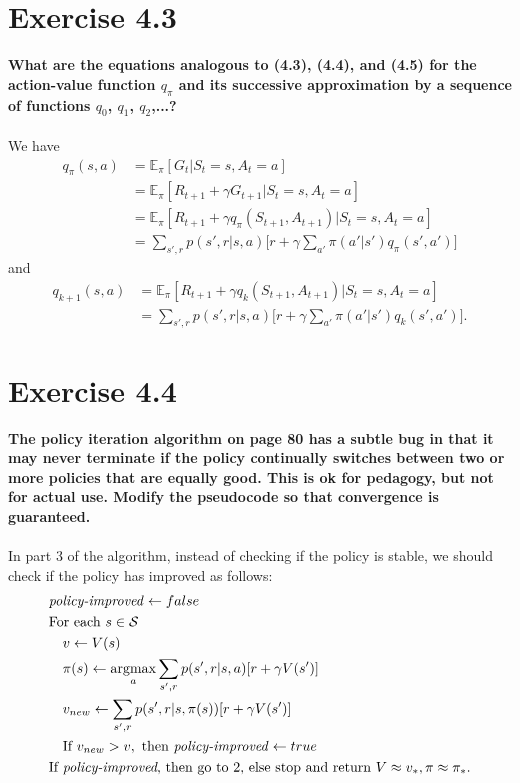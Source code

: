 \documentclass[a4paper,11pt]{article}
\numberwithin{equation}{section}
\theoremstyle{remark}
\newcommand{\E}{\mathbb E}
\DeclareMathOperator*{\argmax}{argmax}
\begin{document}
\section{Exercise 4.3}

\textbf{What are the equations analogous to (4.3), (4.4), and (4.5) for the action-value function $q_\pi$ and its successive approximation by a sequence of functions $q_0$, $q_1$, $q_2$,...?}
\\ \\
We have
\begin{align*}
	q_\pi(s, a) & = \E_\pi [G_t | S_t=s, A_t=a] \\
				& = \E_\pi [R_{t+1} + \gamma G_{t+1} | S_t=s, A_t=a] \\
				& = \E_\pi [R_{t+1} + \gamma q_\pi(S_{t+1}, A_{t+1}) |  S_t=s, A_t=a] \\
				& = \sum_{s', r} p(s', r | s, a)\Big[ r + \gamma \sum_{a'} \pi(a' | s') q_\pi(s', a') \Big]
\end{align*}
and
\begin{align*}
	q_{k+1}(s, a) & = \E_\pi [R_{t+1} + \gamma q_k(S_{t+1}, A_{t+1}) |  S_t=s, A_t=a] \\
				  & = \sum_{s', r} p(s', r | s, a)\Big[ r + \gamma \sum_{a'} \pi(a' | s') q_k(s', a') \Big].
\end{align*}

\section{Exercise 4.4}

\textbf{The policy iteration algorithm on page 80 has a subtle bug in that it may never terminate if the policy continually switches between two or more policies that are equally good. This is ok for pedagogy, but not for actual use. Modify the pseudocode so that convergence is guaranteed.}
\\ \\
In part 3 of the algorithm, instead of checking if the policy is stable, we should check if the policy has improved as follows:
\begin{align*}
	& \text{\emph{policy-improved}} \gets false \\
	& \text{For } \text{each } s \in \mathcal{S} \\
	& \quad v \gets V(s) \\
	& \quad \pi(s) \gets \argmax_a \sum_{s', r} p(s', r | s, a) [r + \gamma V(s')] \\
	& \quad v_{new} \gets \sum_{s', r} p(s', r | s, \pi(s)) [r + \gamma V(s')] \\
	& \quad \text{If } v_{new} > v, \text{ then } \text{\emph{policy-improved}} \gets true \\
	& \text{If \emph{policy-improved}, then go to 2, else stop and return } V \approx v_*, \pi \approx \pi_*.
\end{align*}
\end{document}
